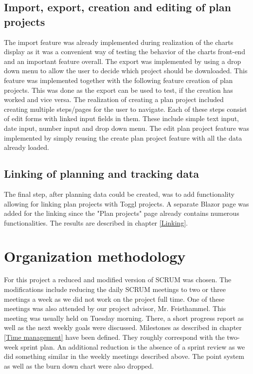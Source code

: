 \subsection{Import, export, creation and editing of plan projects}
The import feature was already implemented during realization of the charts display as it was a convenient way of testing the behavior of the charts front-end and an important feature overall. The export was implemented by using a drop down menu to allow the user to decide which project should be downloaded. This feature was implemented together with the following feature creation of plan projects. This was done as the export can be used to test, if the creation has worked and vice versa. The realization of creating a plan project included creating multiple steps/pages for the user to navigate. Each of these steps consist of edit forms with linked input fields in them. These include simple text input, date input, number input and drop down menu. The edit plan project feature was implemented by simply reusing the create plan project feature with all the data already loaded.

\subsection{Linking of planning and tracking data}
The final step, after planning data could be created, was to add functionality allowing for linking plan projects with Toggl projects. A separate Blazor page was added for the linking since the "Plan projects" page already contains numerous functionalities. The results are described in chapter \ref{Linking}.

\section{Organization methodology}
For this project a reduced and modified version of SCRUM \cite{scrum_url} was chosen. The modifications include reducing the daily SCRUM meetings to two or three meetings a week as we did not work on the project full time. One of these meetings was also attended by our project advisor, Mr. Feisthammel. This meeting was usually held on Tuesday morning. There, a short progress report as well as the next weekly goals were discussed. Milestones as described in chapter \ref{Time management} have been defined. They roughly correspond with the two-week sprint plan. An additional reduction is the absence of a sprint review as we did something similar in the weekly meetings described above. The point system as well as the burn down chart were also dropped.

